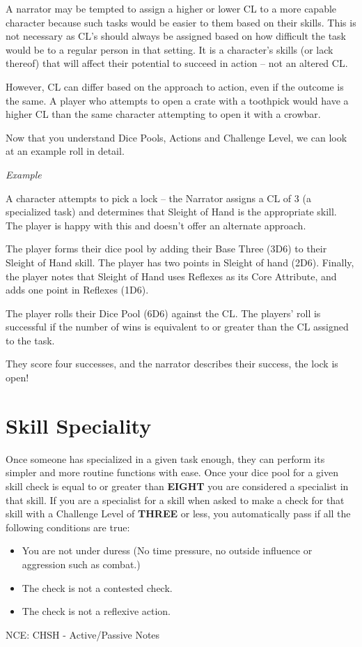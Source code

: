 A narrator may be tempted to assign a higher or lower CL to a more capable character because such tasks would be easier to them based on their skills. This is not necessary as CL’s should always be assigned based on how difficult the task would be to a regular person in that setting. It is a character’s skills (or lack thereof) that will affect their potential to succeed in action – not an altered CL.

However, CL can differ based on the approach to action, even if the outcome is the same. A player who attempts to open a crate with a toothpick would have a higher CL than the same character attempting to open it with a crowbar.

Now that you understand Dice Pools, Actions and Challenge Level, we can look at an example roll in detail.

\textit{Example}

A character attempts to pick a lock – the Narrator assigns a CL of 3 (a specialized task) and determines that Sleight of Hand is the appropriate skill. The player is happy with this and doesn't offer an alternate approach.

The player forms their dice pool by adding their Base Three (3D6) to their Sleight of Hand skill. The player has two points in Sleight of hand (2D6). Finally, the player notes that Sleight of Hand uses Reflexes as its Core Attribute, and adds one point in Reflexes (1D6).

The player rolls their Dice Pool (6D6) against the CL. The players' roll is successful if the number of wins is equivalent to or greater than the CL assigned to the task.

They score four successes, and the narrator describes their success, the lock is open!

\section{Skill Speciality} \label{sec:skill_speciality}

Once someone has specialized in a given task enough, they can perform its simpler and more routine functions with ease. Once your dice pool for a given skill check is equal to or greater than \textbf{EIGHT} you are considered a specialist in that skill. If you are a specialist for a skill when asked to make a check for that skill with a Challenge Level of \textbf{THREE} or less, you automatically pass if all the following conditions are true:

\begin{itemize}
    \item You are not under duress (No time pressure, no outside influence or aggression such as combat.)
    \item The check is not a contested check.
    \item The check is not a reflexive action.
\end{itemize}

NCE: CHSH - Active/Passive Notes
